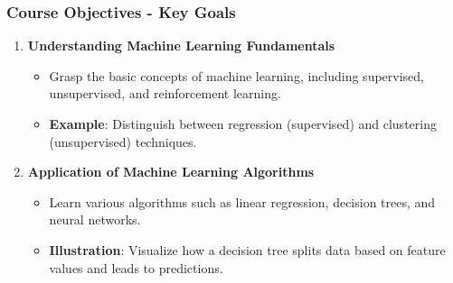 \documentclass[aspectratio=169]{beamer}
\begin{document}
\begin{frame}[fragile]
    \frametitle{Course Objectives - Key Goals}
    \begin{enumerate}
        \item \textbf{Understanding Machine Learning Fundamentals}
        \begin{itemize}
            \item Grasp the basic concepts of machine learning, including supervised, unsupervised, and reinforcement learning.
            \item \textbf{Example}: Distinguish between regression (supervised) and clustering (unsupervised) techniques.
        \end{itemize}

        \item \textbf{Application of Machine Learning Algorithms}
        \begin{itemize}
            \item Learn various algorithms such as linear regression, decision trees, and neural networks.
            \item \textbf{Illustration}: Visualize how a decision tree splits data based on feature values and leads to predictions.
        \end{itemize}
    \end{enumerate}
\end{frame}
\end{document}
